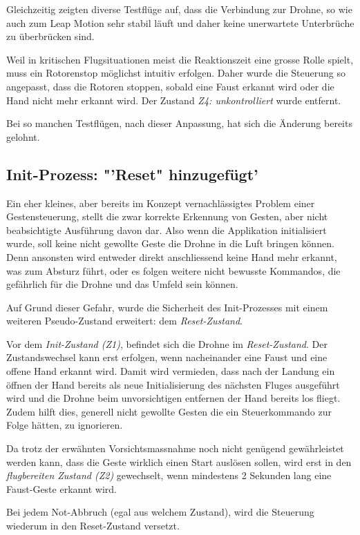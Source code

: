 Gleichzeitig zeigten diverse Testflüge auf, dass die Verbindung zur Drohne, so wie auch zum Leap Motion sehr stabil läuft und daher keine unerwartete Unterbrüche zu überbrücken sind.

Weil in kritischen Flugsituationen meist die Reaktionszeit eine grosse Rolle spielt, muss ein Rotorenstop möglichst intuitiv erfolgen.
Daher wurde die Steuerung so angepasst, dass die Rotoren stoppen, sobald eine Faust erkannt wird oder die Hand nicht mehr erkannt wird.
Der Zustand \textit{Z4: unkontrolliert} wurde entfernt.

Bei so manchen Testflügen, nach dieser Anpassung, hat sich die Änderung bereits gelohnt.

\subsection{Init-Prozess: "'Reset" hinzugefügt'}
Ein eher kleines, aber bereits im Konzept vernachlässigtes Problem einer Gestensteuerung, stellt die zwar korrekte Erkennung von Gesten, aber nicht beabsichtigte Ausführung davon dar.
Also wenn die Applikation initialisiert wurde, soll keine nicht gewollte  Geste die Drohne in die Luft bringen können.
Denn ansonsten wird entweder direkt anschliessend keine Hand mehr erkannt, was zum Absturz führt, oder es folgen weitere nicht bewusste Kommandos, die gefährlich für die Drohne und das Umfeld sein können.

Auf Grund dieser Gefahr, wurde die Sicherheit des Init-Prozesses mit einem weiteren Pseudo-Zustand erweitert: dem \textit{Reset-Zustand}.

Vor dem \textit{Init-Zustand (Z1)}, befindet sich die Drohne im \textit{Reset-Zustand}. Der Zustandswechsel kann erst erfolgen, wenn nacheinander eine Faust und eine offene Hand erkannt wird. Damit wird vermieden, dass nach der Landung ein öffnen der Hand bereits als neue Initialisierung des nächsten Fluges ausgeführt wird und die Drohne beim unvorsichtigen entfernen der Hand bereits los fliegt.
Zudem hilft dies, generell nicht gewollte Gesten die ein Steuerkommando zur Folge hätten, zu ignorieren.

Da trotz der erwähnten Vorsichtsmassnahme noch nicht genügend gewährleistet werden kann, dass die Geste wirklich einen Start auslösen sollen, wird erst in den \textit{flugbereiten Zustand (Z2)} gewechselt, wenn mindestens 2 Sekunden lang eine Faust-Geste erkannt wird.

Bei jedem Not-Abbruch (egal aus welchem Zustand), wird die Steuerung wiederum in den Reset-Zustand versetzt.

